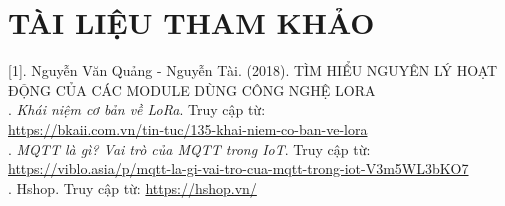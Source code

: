 \section*{TÀI LIỆU THAM KHẢO}
[1]. Nguyễn Văn Quảng - Nguyễn Tài. (2018). TÌM HIỂU NGUYÊN LÝ HOẠT ĐỘNG CỦA CÁC MODULE DÙNG CÔNG NGHỆ LORA\\
\indent [2]. \textit{Khái niệm cơ bản về LoRa}. Truy cập từ:\\
\indent \url{https://bkaii.com.vn/tin-tuc/135-khai-niem-co-ban-ve-lora}\\
\indent [3]. \textit{MQTT là gì? Vai trò của MQTT trong IoT}. Truy cập từ:\\
\indent \url{https://viblo.asia/p/mqtt-la-gi-vai-tro-cua-mqtt-trong-iot-V3m5WL3bKO7}\\
\indent [4]. Hshop. Truy cập từ: \url{https://hshop.vn/}
